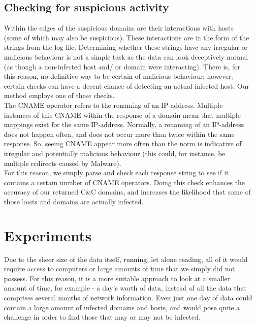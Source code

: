 \documentclass{article} %
\begin{document}
\subsection{Checking for suspicious activity}
Within the edges of the suspicious domains are their interactions with hosts (some of which may also be suspicious). These interactions are in the form of the strings from the log file. Determining whether these strings have any irregular or
malicious behaviour is not a simple task as the data can look deceptively normal (as though a non-infected host and/ or domain were interacting). There is, for this reason, no definitive way to be certain of malicious behaviour; however, 
certain checks can have a decent chance of detecting an actual infected host. Our method employs one of these checks. \\
The CNAME operator refers to the renaming of an IP-address. Multiple instances of this CNAME within the response of a domain mean that multiple mappings exist for the same IP-address. Normally, a renaming of an IP-address does not happen often,
and does not occur more than twice within the same response. So, seeing CNAME appear more often than the norm is indicative of irregular and potentially malicious behaviour (this could, for instance, be multiple redirects caused by Malware). \\
For this reason, we simply parse and check each response string to see if it contains a certain number of CNAME operators.
Doing this check enhances the accuracy of our returned C\&C domains, and increases the likelihood that some of those hosts and domains are actually infected. 

\section{Experiments}
\label{exp}
Due to the sheer size of the data itself, running, let alone reading, all of it would require access to computers or large amounts of time that we simply did not possess. For this reason, it is a more suitable approach to 
look at a smaller amount of time, for example - a day's worth of data, instead of all the data that comprises several months of network information. Even just one day of data could contain a large amount of infected domains 
and hosts, and would pose quite a challenge in order to find those that may or may not be infected.
\end{document}
